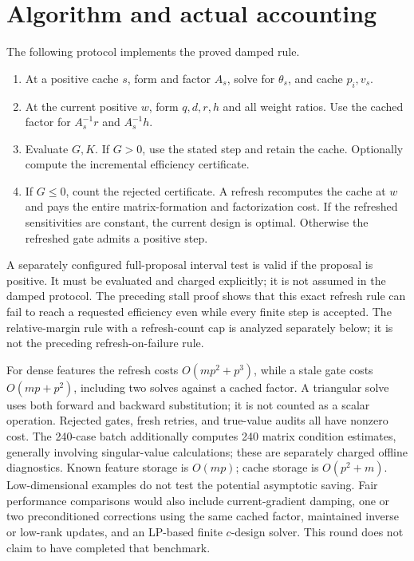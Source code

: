 \documentclass[11pt]{article}
\begin{document}
\section{Algorithm and actual accounting}
The following protocol implements the proved damped rule.
\begin{enumerate}[label=\arabic*.]
\item At a positive cache $s$, form and factor $A_s$, solve for $\theta_s$, and cache $p_i,v_s$.
\item At the current positive $w$, form $q,d,r,h$ and all weight ratios. Use the cached factor for $A_s^{-1}r$ and $A_s^{-1}h$.
\item Evaluate $G,K$. If $G>0$, use the stated step and retain the cache. Optionally compute the incremental efficiency certificate.
\item If $G\le0$, count the rejected certificate. A refresh recomputes the cache at $w$ and pays the entire matrix-formation and factorization cost. If the refreshed sensitivities are constant, the current design is optimal. Otherwise the refreshed gate admits a positive step.
\end{enumerate}
A separately configured full-proposal interval test is valid if the proposal is positive. It must be evaluated and charged explicitly; it is not assumed in the damped protocol. The preceding stall proof shows that this exact refresh rule can fail to reach a requested efficiency even while every finite step is accepted. The relative-margin rule with a refresh-count cap is analyzed separately below; it is not the preceding refresh-on-failure rule.

For dense features the refresh costs $O(mp^2+p^3)$, while a stale gate costs $O(mp+p^2)$, including two solves against a cached factor. A triangular solve uses both forward and backward substitution; it is not counted as a scalar operation. Rejected gates, fresh retries, and true-value audits all have nonzero cost. The 240-case batch additionally computes 240 matrix condition estimates, generally involving singular-value calculations; these are separately charged offline diagnostics. Known feature storage is $O(mp)$; cache storage is $O(p^2+m)$.
Low-dimensional examples do not test the potential asymptotic saving. Fair performance comparisons would also include current-gradient damping, one or two preconditioned corrections using the same cached factor, maintained inverse or low-rank updates, and an LP-based finite $c$-design solver. This round does not claim to have completed that benchmark.
\end{document}
